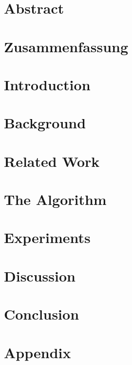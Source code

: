 \documentclass[12pt]{scrbook}
\begin{document}
\chapter*{Abstract}

%
\chapter*{Zusammenfassung}

%
\tableofcontents
%
%
\chapter{Introduction}
\label{introduction}

%
\chapter{Background}
\label{background}


\chapter{Related Work}
\label{related}

%
\chapter{The Algorithm}
\label{algorithm}

%
\chapter{Experiments}
\label{experiments}

%
\chapter{Discussion}
\label{discussion}

%
\chapter{Conclusion}

%
\printbibliography
%
\setcounter{figure}{0}
\setcounter{table}{0}
\renewcommand{\thefigure}{A.\arabic{figure}}
\renewcommand{\thetable}{A.\arabic{table}}
\chapter*{Appendix}  %


%
\end{document}
